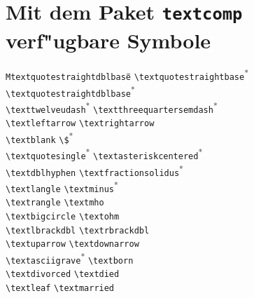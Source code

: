 
\appendix

\enlargethispage*{2.5\baselineskip}

\section{Mit dem Paket \texttt{textcomp} verf"ugbare Symbole}
\label{textsymbols}
{\small
\begin{tabbing}
\quad\quad\=\texttt{Mtextquotestraightdblbase}\hspace{1cm}\=\quad\quad\=\kill
\textquotestraightbase \> \verb+\textquotestraightbase+\textsuperscript{*}  \> \textquotestraightdblbase \> \verb+\textquotestraightdblbase+\textsuperscript{*} \\
\texttwelveudash \> \verb+\texttwelveudash+\textsuperscript{*}  \> \textthreequartersemdash \> \verb+\textthreequartersemdash+\textsuperscript{*} \\
\textleftarrow \> \verb+\textleftarrow+ \> \textrightarrow \> \verb+\textrightarrow+\\
\textblank \> \verb+\textblank+ \> \textdollar \> \verb+\$+\textsuperscript{*} \\
\textquotesingle \> \verb+\textquotesingle+\textsuperscript{*}  \> \textasteriskcentered \> \verb+\textasteriskcentered+\textsuperscript{*} \\
\textdblhyphen \> \verb+\textdblhyphen+ \> \textfractionsolidus \> \verb+\textfractionsolidus+\textsuperscript{*} \\
\textlangle \> \verb+\textlangle+ \> \textminus \> \verb+\textminus+\textsuperscript{*} \\
\textrangle \> \verb+\textrangle+ \> \textmho \> \verb+\textmho+\\
\textbigcircle \> \verb+\textbigcircle+ \> \textohm \> \verb+\textohm+\\
\textlbrackdbl \> \verb+\textlbrackdbl+ \> \textrbrackdbl \> \verb+\textrbrackdbl+\\
\textuparrow \> \verb+\textuparrow+ \> \textdownarrow \> \verb+\textdownarrow+\\
\textasciigrave \> \verb+\textasciigrave+\textsuperscript{*}  \> \textborn \> \verb+\textborn+\\
\textdivorced \> \verb+\textdivorced+ \> \textdied \> \verb+\textdied+\\
\textleaf \> \verb+\textleaf+ \> \textmarried \> \verb+\textmarried+\\

\end{tabbing}}
